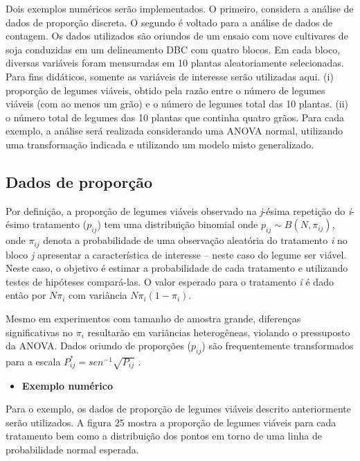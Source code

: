 \documentclass[
]{book}
\providecommand{\tightlist}{%
  \setlength{\itemsep}{0pt}\setlength{\parskip}{0pt}}
\begin{document}
Dois exemplos numéricos serão implementados. O primeiro, considera a análise de dados de proporção discreta. O segundo é voltado para a análise de dados de contagem. Os dados utilizados são oriundos de um ensaio com nove cultivares de soja conduzidas em um delineamento DBC com quatro blocos. Em cada bloco, diversas variáveis foram mensuradas em 10 plantas aleatoriamente selecionadas. Para fins didáticos, somente as variáveis de interesse serão utilizadas aqui. (i) proporção de legumes viáveis, obtido pela razão entre o número de legumes viáveis (com ao menos um grão) e o número de legumes total das 10 plantas. (ii) o número total de legumes das 10 plantas que continha quatro grãos. Para cada exemplo, a análise será realizada considerando uma ANOVA normal, utilizando uma transformação indicada e utilizando um modelo misto generalizado.

\hypertarget{dados-de-proporuxe7uxe3o}{%
\subsection{Dados de proporção}\label{dados-de-proporuxe7uxe3o}}

Por definição, a proporção de legumes viáveis observado na \emph{j}-ésima repetição do \emph{i}-ésimo tratamento (\(p_{ij}\)) tem uma distribuição binomial onde \(p_{ij} \sim B(N, \pi_{ij})\), onde \(\pi_{ij}\) denota a probabilidade de uma observação aleatória do tratamento \emph{i} no bloco \emph{j} apresentar a característica de interesse -- neste caso do legume ser viável. Neste caso, o objetivo é estimar a probabilidade de cada tratamento e utilizando testes de hipóteses compará-las. O valor esperado para o tratamento \emph{i} é dado então por \(N\pi_i\) com variância \(N\pi_i(1-\pi_i)\).

Mesmo em experimentos com tamanho de amostra grande, diferenças significativas no \(\pi_i\) resultarão em variãncias heterogêneas, violando o pressuposto da ANOVA. Dados oriundo de proporções (\(p_{ij}\)) são frequentemente transformados para a escala \(P^*_{ij} = sen^{-1} \sqrt{P_{ij}}\) \citep{Rodrigues-Soares2018}.

\begin{itemize}
\tightlist
\item
  \textbf{Exemplo numérico}
\end{itemize}

Para o exemplo, os dados de proporção de legumes viáveis descrito anteriormente serão utilizados. A figura 25 mostra a proporção de legumes viáveis para cada tratamento bem como a distribuição dos pontos em torno de uma linha de probabilidade normal esperada.
\end{document}
